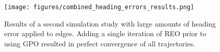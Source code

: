 \begin{figure}[H]
  \texttt{[image: figures/combined\_heading\_errors\_results.png]}
  \caption{Results of a second simulation study with large amounts of heading error applied to edges.  Adding a single iteration of REO prior to using GPO resulted in perfect convergence of all trajectories.}
  \label{fig:heading_error_results}
\end{figure}





